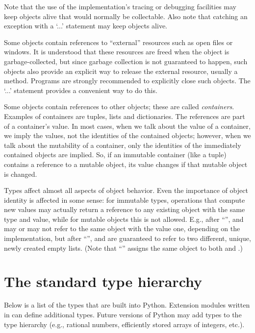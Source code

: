 Note that the use of the implementation's tracing or debugging
facilities may keep objects alive that would normally be collectable.
Also note that catching an exception with a
`...' statement may keep objects alive.

Some objects contain references to ``external'' resources such as open
files or windows.  It is understood that these resources are freed
when the object is garbage-collected, but since garbage collection is
not guaranteed to happen, such objects also provide an explicit way to
release the external resource, usually a  method.
Programs are strongly recommended to explicitly close such
objects.
The `...' statement provides a convenient way
to do this.

Some objects contain references to other objects; these are called
\emph{containers}.  Examples of containers are tuples, lists and
dictionaries.  The references are part of a container's value.  In
most cases, when we talk about the value of a container, we imply the
values, not the identities of the contained objects; however, when we
talk about the mutability of a container, only the identities of
the immediately contained objects are implied.  So, if an immutable
container (like a tuple)
contains a reference to a mutable object, its value changes
if that mutable object is changed.

Types affect almost all aspects of object behavior.  Even the importance
of object identity is affected in some sense: for immutable types,
operations that compute new values may actually return a reference to
any existing object with the same type and value, while for mutable
objects this is not allowed.  E.g., after
``'',
 and  may or may not refer to the same object with the
value one, depending on the implementation, but after
``'',  and 
are guaranteed to refer to two different, unique, newly created empty
lists.
(Note that ``'' assigns the same object to both
 and .)

\section{The standard type hierarchy\label{types}}

Below is a list of the types that are built into Python.  Extension
modules written in \C{} can define additional types.  Future versions of
Python may add types to the type hierarchy (e.g., rational
numbers, efficiently stored arrays of integers, etc.).

